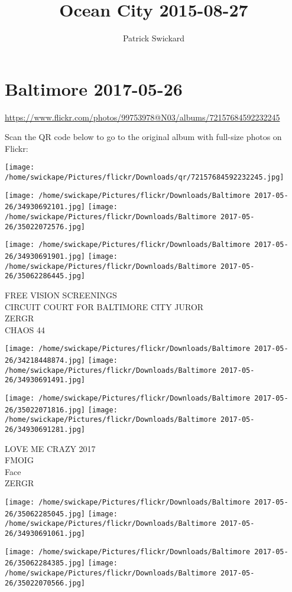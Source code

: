 \documentclass[10pt,letterpaper]{article}
\title{Ocean City 2015-08-27}
\author{Patrick Swickard}
\date{}
\begin{document}
\section*{Baltimore 2017-05-26}

\url{https://www.flickr.com/photos/99753978@N03/albums/72157684592232245}

Scan the QR code below to go to the original album with full-size photos on Flickr:

\texttt{[image: /home/swickape/Pictures/flickr/Downloads/qr/72157684592232245.jpg]}
\pagebreak

\texttt{[image: /home/swickape/Pictures/flickr/Downloads/Baltimore 2017-05-26/34930692101.jpg]}
\texttt{[image: /home/swickape/Pictures/flickr/Downloads/Baltimore 2017-05-26/35022072576.jpg]}

\texttt{[image: /home/swickape/Pictures/flickr/Downloads/Baltimore 2017-05-26/34930691901.jpg]}
\texttt{[image: /home/swickape/Pictures/flickr/Downloads/Baltimore 2017-05-26/35062286445.jpg]}

FREE VISION SCREENINGS\\
CIRCUIT COURT FOR BALTIMORE CITY JUROR\\
ZERGR\\
CHAOS 44
\pagebreak

\texttt{[image: /home/swickape/Pictures/flickr/Downloads/Baltimore 2017-05-26/34218448874.jpg]}
\texttt{[image: /home/swickape/Pictures/flickr/Downloads/Baltimore 2017-05-26/34930691491.jpg]}

\texttt{[image: /home/swickape/Pictures/flickr/Downloads/Baltimore 2017-05-26/35022071816.jpg]}
\texttt{[image: /home/swickape/Pictures/flickr/Downloads/Baltimore 2017-05-26/34930691281.jpg]}

LOVE ME CRAZY 2017\\
FMOIG\\
Face\\
ZERGR
\pagebreak

\texttt{[image: /home/swickape/Pictures/flickr/Downloads/Baltimore 2017-05-26/35062285045.jpg]}
\texttt{[image: /home/swickape/Pictures/flickr/Downloads/Baltimore 2017-05-26/34930691061.jpg]}

\texttt{[image: /home/swickape/Pictures/flickr/Downloads/Baltimore 2017-05-26/35062284385.jpg]}
\texttt{[image: /home/swickape/Pictures/flickr/Downloads/Baltimore 2017-05-26/35022070566.jpg]}
\end{document}
